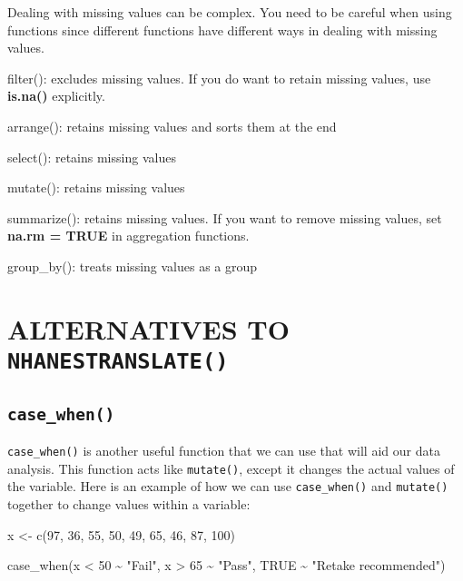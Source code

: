\documentclass[
]{book}
\newenvironment{Shaded}{\begin{snugshade}}{\end{snugshade}}
\newcommand{\ConstantTok}[1]{\textcolor[rgb]{0.00,0.00,0.00}{#1}}
\newcommand{\DecValTok}[1]{\textcolor[rgb]{0.00,0.00,0.81}{#1}}
\newcommand{\FunctionTok}[1]{\textcolor[rgb]{0.00,0.00,0.00}{#1}}
\newcommand{\NormalTok}[1]{#1}
\newcommand{\OtherTok}[1]{\textcolor[rgb]{0.56,0.35,0.01}{#1}}
\newcommand{\SpecialCharTok}[1]{\textcolor[rgb]{0.00,0.00,0.00}{#1}}
\newcommand{\StringTok}[1]{\textcolor[rgb]{0.31,0.60,0.02}{#1}}
\begin{document}
Dealing with missing values can be complex. You need to be careful when using functions since different functions have different ways in dealing with missing values.

filter(): excludes missing values. If you do want to retain missing values, use \textbf{is.na()} explicitly.

arrange(): retains missing values and sorts them at the end

select(): retains missing values

mutate(): retains missing values

summarize(): retains missing values. If you want to remove missing values, set \textbf{na.rm = TRUE} in aggregation functions.

group\_by(): treats missing values as a group

\hypertarget{alternatives-to-nhanestranslate}{%
\section{\texorpdfstring{ALTERNATIVES TO \texttt{NHANESTRANSLATE()}}{ALTERNATIVES TO NHANESTRANSLATE()}}\label{alternatives-to-nhanestranslate}}

\hypertarget{case_when}{%
\subsection{\texorpdfstring{\texttt{case\_when()}}{case\_when()}}\label{case_when}}

\texttt{case\_when()} is another useful function that we can use that will aid our data analysis. This function acts like \texttt{mutate()}, except it changes the actual values of the variable. Here is an example of how we can use \texttt{case\_when()} and \texttt{mutate()} together to change values within a variable:

\begin{Shaded}
\begin{Highlighting}[]
\NormalTok{x }\OtherTok{\textless{}{-}} \FunctionTok{c}\NormalTok{(}\DecValTok{97}\NormalTok{, }\DecValTok{36}\NormalTok{, }\DecValTok{55}\NormalTok{, }\DecValTok{50}\NormalTok{, }\DecValTok{49}\NormalTok{, }\DecValTok{65}\NormalTok{, }\DecValTok{46}\NormalTok{, }\DecValTok{87}\NormalTok{, }\DecValTok{100}\NormalTok{)}
\end{Highlighting}
\end{Shaded}

\begin{Shaded}
\begin{Highlighting}[]
\FunctionTok{case\_when}\NormalTok{(x }\SpecialCharTok{\textless{}} \DecValTok{50} \SpecialCharTok{\textasciitilde{}} \StringTok{"Fail"}\NormalTok{, }
\NormalTok{          x }\SpecialCharTok{\textgreater{}} \DecValTok{65} \SpecialCharTok{\textasciitilde{}} \StringTok{"Pass"}\NormalTok{, }
          \ConstantTok{TRUE}  \SpecialCharTok{\textasciitilde{}} \StringTok{"Retake recommended"}\NormalTok{)}
\end{Highlighting}
\end{Shaded}
\end{document}
